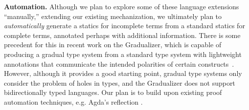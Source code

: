 \vspace{0.25ex} 
\noindent\textbf{Automation.} Although we plan to
    explore some of these language extensions 
    ``manually,'' extending our existing mechanization, we ultimately plan 
    to \emph{automatically}
    generate a statics for incomplete terms from a standard statics for complete terms,
    annotated perhaps with additional information. There is some precedent for
    this in recent work on the Gradualizer, which is capable of
    producing a gradual type system from a standard type system with lightweight
    annotations that communicate the intended polarities of certain
    constructs~\cite{DBLP:conf/popl/CiminiS16}. However, although it provides a good starting point, gradual type systems 
    only consider the problem of holes in 
    types, and the Gradualizer does not support bidirectionally typed languages.
    Our plan is to build 
    upon existing proof automation techniques, e.g. Agda's reflection \cite{van2012engineering}.

